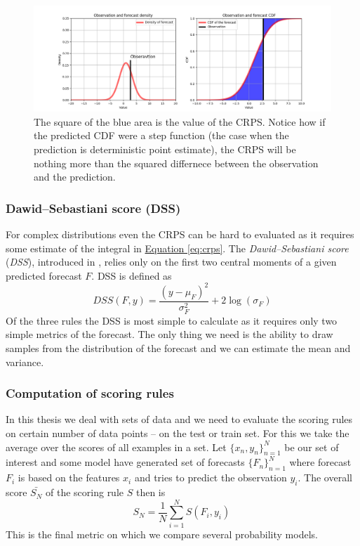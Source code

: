 \documentclass[12pt,a4paper,twoside]{scrartcl}
\numberwithin{equation}{section}
\renewcommand*{\refeq}[1]{\hyperref[#1]{Equation \ref*{#1}}}
\begin{document}
\begin{center}
  \begin{figure}[htbp]
    \centering
    \includegraphics[height=0.5\textwidth, width=1\textwidth]{figures/crps.png}
    \caption[Continuous Rank Probability Score Intuition]{The square of the blue area is the value of the CRPS. Notice how if the predicted CDF were a step function (the case when the prediction is deterministic point estimate), the CRPS will be nothing more than the squared differnece between the observation and the prediction.}\label{fig:crps}
  \end{figure}
\end{center}
\subsubsection{Dawid–Sebastiani score (DSS)}\label{sec:dss}
For complex distributions even the CRPS can be hard to evaluated as it requires some estimate of the integral in \refeq{eq:crps}. The \emph{Dawid–Sebastiani score} (\emph{DSS}), introduced in \cite{dawid1999}, relies only on the first two central moments of a given predicted forecast \(F\). DSS is defined as
\begin{equation}
  DSS(F,y) =  \frac{(y-\mu_F)^2}{\sigma_F^2}+2\log(\sigma_F)
\end{equation}
Of the three rules the DSS is most simple to calculate as it requires only two simple metrics of the forecast. The only thing we need is the ability to draw samples from the distribution of the forecast and we can estimate the mean and variance.
\subsubsection{Computation of scoring rules}\label{sec:eval-rules}
In this thesis we deal with sets of data and we need to evaluate the scoring rules on certain number of data points -- on the test or train set. For this we take the average over the scores of all examples in a set. Let \(\{x_n, y_n\}_{n=1}^N\) be our set of interest and some model have generated set of forecasts \(\{F_n\}_{n=1}^N\) where forecast \(F_i\) is based on the features \(x_i\) and tries to predict the observation \(y_i\). The overall score \(\bar{S_N}\) of the scoring rule \(S\) then is
\begin{equation}
  S_N = \frac{1}{N}\sum_{i=1}^N S(F_i, y_i) \,
\end{equation}
This is the final metric on which we compare several probability models.
\end{document}
